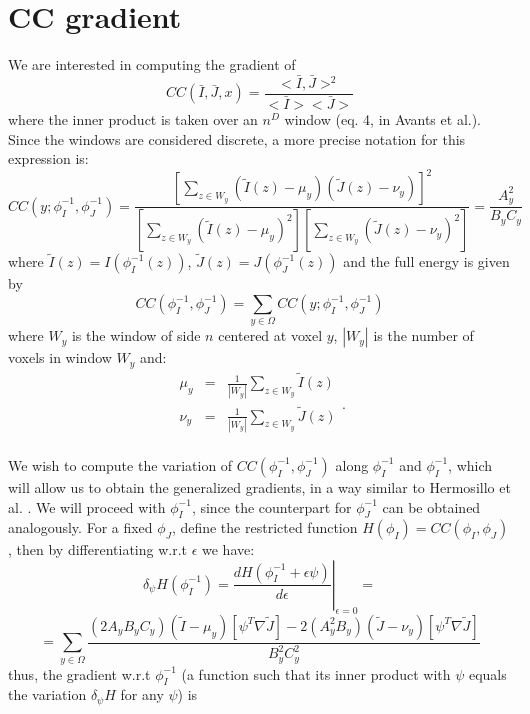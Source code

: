 \section{CC gradient}
We are interested in computing the gradient of
\begin{equation}
    CC(\bar{I}, \bar{J}, x) = \frac{<\bar{I}, \bar{J}>^{2}}{<\bar{I}><\bar{J}>}
\end{equation}
where the inner product is taken over an $n^{D}$ window (eq. 4, in Avants et al.\cite{Avants2008}). Since the windows are considered discrete, a more precise notation
for this expression is:
\begin{equation}
    CC(y;\phi^{-1}_{I}, \phi^{-1}_{J}) = \frac{\left[\sum_{z\in W_{y}} \left(\tilde{I}(z) - \mu_{y}\right)\left(\tilde{J}(z) - \nu_{y}\right)\right]^{2}}
    {\left[\sum_{z \in W_{y}}\left(\tilde{I}(z) - \mu_{y}\right)^{2}\right] \left[\sum_{z \in W_{y}}\left(\tilde{J}(z) - \nu_{y}\right)^{2}\right]} = \frac{A_{y}^{2}}{B_{y}C_{y}}
\end{equation}
where $\tilde{I}(z) = I(\phi_{I}^{-1}(z))$, $\tilde{J}(z) = J(\phi_{J}^{-1}(z))$ and the full energy is given by
\begin{equation}
    CC(\phi^{-1}_{I}, \phi^{-1}_{J}) = \sum_{y\in\Omega} CC(y; \phi^{-1}_{I}, \phi^{-1}_{J})
\end{equation}
where $W_{y}$ is the window of side $n$ centered at voxel $y$, $|W_{y}|$ is the number of voxels in window $W_{y}$ and:
\begin{equation}
    \begin{array}{lll}
        \mu_{y} &=& \frac{1}{|W_{y}|}\sum_{z \in W_{y}}\tilde{I}(z)\\
        \nu_{y} &=& \frac{1}{|W_{y}|}\sum_{z \in W_{y}}\tilde{J}(z)\\
    \end{array}.
\end{equation}

We wish to compute the variation of $CC(\phi^{-1}_{I}, \phi^{-1}_{J})$ along $\phi^{-1}_{I}$ and $\phi^{-1}_{I}$, which will allow us to obtain the generalized gradients,
in a way similar to Hermosillo et al. \cite{Hermosillo2004}. We will proceed with $\phi^{-1}_{I}$, since the counterpart for $\phi^{-1}_{J}$ can be obtained analogously.
For a fixed $\phi_{J}$, define the restricted function $H(\phi_{I}) = CC(\phi_{I}, \phi_{J})$, then by differentiating w.r.t $\epsilon$ we have:
\begin{equation}
    \delta_{\psi} H(\phi^{-1}_{I}) = \left.\frac{d H(\phi^{-1}_{I} + \epsilon \psi)}{d\epsilon}\right|_{\epsilon=0} =
\end{equation}
\begin{equation}
    = \sum_{y\in\Omega}\frac{\left(2A_{y} B_{y}C_{y}\right)(\tilde{I} - \mu_{y})\left[\psi^{T}\nabla \tilde{J}\right] - 2\left(A_{y}^{2}B_{y}\right)(\tilde{J} - \nu_{y})\left[\psi^{T}\nabla \tilde{J}\right]}
                                                {B_{y}^{2} C_{y}^{2}}
\end{equation}
thus, the gradient w.r.t $\phi^{-1}_{I}$ (a function such that its inner product with $\psi$ equals the variation $\delta_{\psi} H$ for any $\psi$\cite{Hermosillo2004}) is

